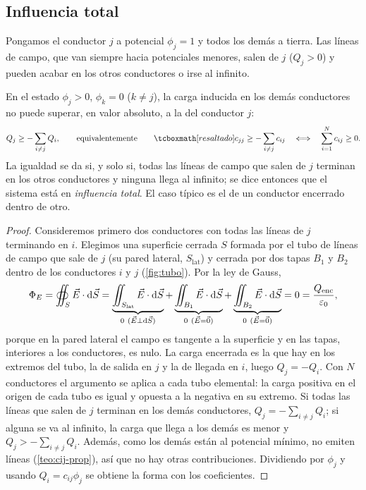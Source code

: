 

\subsection{Influencia total}\label{sec:influencia}
Pongamos el conductor $j$ a potencial $\phi_j=1$ y todos los demás a tierra. Las líneas de campo, que van siempre hacia potenciales menores, salen de
$j$ ($Q_j>0$) y pueden acabar en los otros conductores o irse al infinito.

\begin{teorema}\label{teo:influencia}
En el estado $\phi_j>0$, $\phi_k=0$ ($k\neq j$), la carga inducida en los demás conductores no puede superar, en valor absoluto, a la del conductor $j$:
\begin{equation}\label{eq:influencia}
  Q_j\ge-\sum_{i\neq j}Q_i ,\qquad\text{equivalentemente}\qquad\resalta{c_{jj}\ge-\sum_{i\neq j}c_{ij}\quad\Longleftrightarrow\quad\sum_{i=1}^{N}c_{ij}\ge0 .}
\end{equation}
La igualdad se da si, y solo si, todas las líneas de campo que salen de $j$ terminan en los otros conductores y ninguna llega al infinito; se dice entonces
que el sistema está en \emph{influencia total}. El caso típico es el de un conductor encerrado dentro de otro.
\end{teorema}
\begin{proof}
Consideremos primero dos conductores con todas las líneas de $j$ terminando en $i$. Elegimos una superficie cerrada $S$ formada por el tubo de líneas de
campo que sale de $j$ (su pared lateral, $S_{\mathrm{lat}}$) y cerrada por dos tapas $B_1$ y $B_2$ dentro de los conductores $i$ y $j$
(\cref{fig:tubo}). Por la ley de Gauss,
\[
  \PhiE=\oiint_{S}\vE\cdot\dS=\underbrace{\iint_{S_{\mathrm{lat}}}\vE\cdot\dS}_{0\ (\vE\perp\dS)}+\underbrace{\iint_{B_1}\vE\cdot\dS}_{0\ (\vE=\vc{0})}
  +\underbrace{\iint_{B_2}\vE\cdot\dS}_{0\ (\vE=\vc{0})}=0=\frac{\Qenc}{\eo},
\]
porque en la pared lateral el campo es tangente a la superficie y en las tapas, interiores a los conductores, es nulo. La carga encerrada es la que hay en
los extremos del tubo, la de salida en $j$ y la de llegada en $i$, luego $Q_j=-Q_i$. Con $N$ conductores el argumento se aplica a cada tubo elemental: la
carga positiva en el origen de cada tubo es igual y opuesta a la negativa en su extremo. Si todas las líneas que salen de $j$ terminan en los demás
conductores, $Q_j=-\sum_{i\neq j}Q_i$; si alguna se va al infinito, la carga que llega a los demás es menor y $Q_j>-\sum_{i\neq j}Q_i$. Además, como los
demás están al potencial mínimo, no emiten líneas (\cref{teo:cij-prop}), así que no hay otras contribuciones. Dividiendo por $\phi_j$ y usando
$Q_i=c_{ij}\phi_j$ se obtiene la forma con los coeficientes.
\end{proof}

